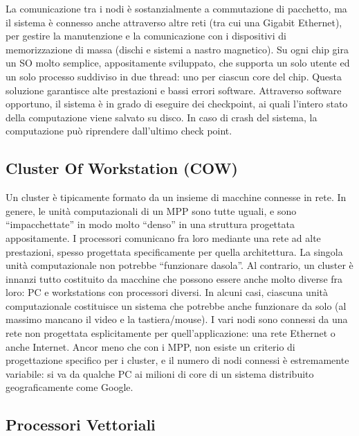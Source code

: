La comunicazione tra i nodi è sostanzialmente a commutazione di
pacchetto, ma il sistema è connesso anche attraverso altre reti (tra
cui una Gigabit Ethernet), per gestire la manutenzione e la
comunicazione con i dispositivi di memorizzazione di massa
(dischi e sistemi a nastro magnetico). Su ogni chip gira un SO molto semplice, appositamente
sviluppato, che supporta un solo utente ed un solo processo
suddiviso in due thread: uno per ciascun core del chip. Questa
soluzione garantisce alte prestazioni e bassi errori software.
Attraverso software opportuno, il sistema è in grado di eseguire dei
checkpoint, ai quali l’intero stato della computazione viene salvato
su disco. In caso di crash del sistema, la computazione può
riprendere dall’ultimo check point.


\subsection{Cluster Of Workstation (COW)}

Un cluster è tipicamente formato da un insieme di macchine
connesse in rete. In genere, le unità
computazionali di un MPP sono tutte uguali, e sono
“impacchettate” in modo molto “denso” in una struttura
progettata appositamente. I processori comunicano fra loro mediante una rete ad alte
prestazioni, spesso progettata specificamente per quella architettura. La singola unità computazionale non potrebbe “funzionare dasola”. Al contrario, un cluster è innanzi tutto costituito da macchine che
possono essere anche molto diverse fra loro: PC e workstations con
processori diversi. In alcuni casi, ciascuna unità computazionale costituisce un sistema
che potrebbe anche funzionare da solo (al massimo mancano il
video e la tastiera/mouse). I vari nodi sono connessi da una rete non progettata esplicitamente
per quell’applicazione: una rete Ethernet o anche Internet. Ancor meno che con i MPP, non esiste un criterio di progettazione
specifico per i cluster, e il numero di nodi connessi è estremamente
variabile: si va da qualche PC ai milioni di core di un sistema
distribuito geograficamente come Google. 

\subsection{Processori Vettoriali}

